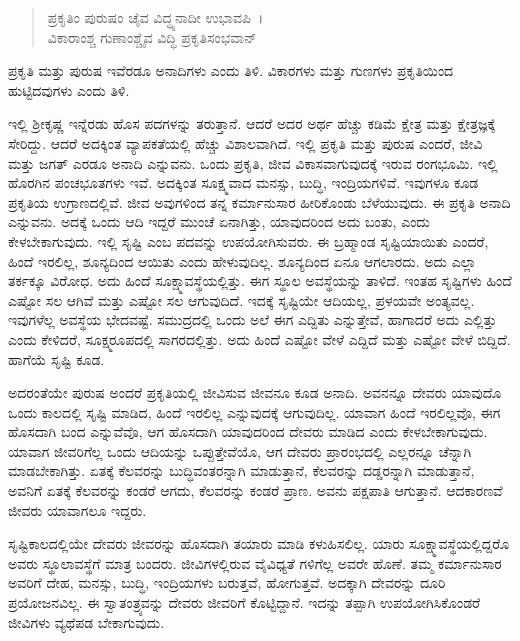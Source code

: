 \begin{verse}
ಪ್ರಕೃತಿಂ ಪುರುಷಂ ಚೈವ ವಿದ್ಧ್ಯನಾದೀ ಉಭಾವಪಿ~।\\ವಿಕಾರಾಂಶ್ಚ ಗುಣಾಂಶ್ಚೈವ ವಿದ್ಧಿ ಪ್ರಕೃತಿಸಂಭವಾನ್ 
\end{verse}

{\small ಪ್ರಕೃತಿ ಮತ್ತು ಪುರುಷ ಇವೆರಡೂ ಅನಾದಿಗಳು ಎಂದು ತಿಳಿ. ವಿಕಾರಗಳು ಮತ್ತು ಗುಣಗಳು ಪ್ರಕೃತಿಯಿಂದ ಹುಟ್ಟಿದವುಗಳು ಎಂದು ತಿಳಿ.}

ಇಲ್ಲಿ ಶ‍್ರೀಕೃಷ್ಣ ಇನ್ನೆರಡು ಹೊಸ ಪದಗಳನ್ನು ತರುತ್ತಾನೆ. ಆದರೆ ಅದರ ಅರ್ಥ ಹೆಚ್ಚು ಕಡಿಮೆ ಕ್ಷೇತ್ರ ಮತ್ತು ಕ್ಷೇತ್ರಜ್ಞಕ್ಕೆ ಸೇರಿದ್ದು. ಆದರೆ ಅದಕ್ಕಿಂತ ವ್ಯಾಪಕತೆಯಲ್ಲಿ ಹೆಚ್ಚು ವಿಶಾಲವಾಗಿದೆ. ಇಲ್ಲಿ ಪ್ರಕೃತಿ ಮತ್ತು ಪುರುಷ ಎಂದರೆ, ಜೀವಿ ಮತ್ತು ಜಗತ್ ಎರಡೂ ಅನಾದಿ ಎನ್ನುವನು. ಒಂದು ಪ್ರಕೃತಿ, ಜೀವ ವಿಕಾಸವಾಗುವುದಕ್ಕೆ ಇರುವ ರಂಗಭೂಮಿ. ಇಲ್ಲಿ ಹೊರಗಿನ ಪಂಚಭೂತಗಳು ಇವೆ. ಅದಕ್ಕಿಂತ ಸೂಕ್ಷ್ಮವಾದ ಮನಸ್ಸು, ಬುದ್ಧಿ, ಇಂದ್ರಿಯಗಳಿವೆ. ಇವುಗಳೂ ಕೂಡ ಪ್ರಕೃತಿಯ ಉಗ್ರಾಣದಲ್ಲಿವೆ. ಜೀವ ಅವುಗಳಿಂದ ತನ್ನ ಕರ್ಮಾನುಸಾರ ಹೀರಿಕೊಂಡು ಬೆಳೆಯುವುದು. ಈ ಪ್ರಕೃತಿ ಅನಾದಿ ಎನ್ನುವನು. ಅದಕ್ಕೆ ಒಂದು ಆದಿ ಇದ್ದರೆ ಮುಂಚೆ ಏನಾಗಿತ್ತು, ಯಾವುದರಿಂದ ಅದು ಬಂತು, ಎಂದು ಕೇಳಬೇಕಾಗುವುದು. ಇಲ್ಲಿ ಸೃಷ್ಟಿ ಎಂಬ ಪದವನ್ನು ಉಪಯೋಗಿಸುವರು. ಈ ಬ್ರಹ್ಮಾಂಡ ಸೃಷ್ಟಿಯಾಯಿತು ಎಂದರೆ, ಹಿಂದೆ ಇರಲಿಲ್ಲ, ಶೂನ್ಯದಿಂದ ಆಯಿತು ಎಂದು ಹೇಳುವುದಿಲ್ಲ. ಶೂನ್ಯದಿಂದ ಏನೂ ಆಗಲಾರದು. ಅದು ಎಲ್ಲಾ ತರ್ಕಕ್ಕೂ ವಿರೋಧ. ಅದು ಹಿಂದೆ ಸೂಕ್ಷ್ಮಾವಸ್ಥೆಯಲ್ಲಿತ್ತು. ಈಗ ಸ್ಥೂಲ ಅವಸ್ಥೆಯನ್ನು ತಾಳಿದೆ. ಇಂತಹ ಸೃಷ್ಟಿಗಳು ಹಿಂದೆ ಎಷ್ಟೋ ಸಲ ಆಗಿವೆ ಮತ್ತು ಎಷ್ಟೋ ಸಲ ಆಗುವುದಿದೆ. ಇದಕ್ಕೆ ಸೃಷ್ಟಿಯೇ ಆದಿಯಲ್ಲ, ಪ್ರಳಯವೇ ಅಂತ್ಯವಲ್ಲ. ಇವುಗಳೆಲ್ಲ ಅವಸ್ಥೆಯ ಭೇದವಷ್ಟೆ. ಸಮುದ್ರದಲ್ಲಿ ಒಂದು ಅಲೆ ಈಗ ಎದ್ದಿತು ಎನ್ನುತ್ತೇವೆ, ಹಾಗಾದರೆ ಅದು ಎಲ್ಲಿತ್ತು ಎಂದು ಕೇಳಿದರೆ, ಸೂಕ್ಷ್ಮರೂಪದಲ್ಲಿ ಸಾಗರದಲ್ಲಿತ್ತು. ಅದು ಹಿಂದೆ ಎಷ್ಟೋ ವೇಳೆ ಎದ್ದಿದೆ ಮತ್ತು ಎಷ್ಟೋ ವೇಳೆ ಬಿದ್ದಿದೆ. ಹಾಗೆಯೆ ಸೃಷ್ಟಿ ಕೂಡ.

ಅದರಂತೆಯೇ ಪುರುಷ ಅಂದರೆ ಪ್ರಕೃತಿಯಲ್ಲಿ ಜೀವಿಸುವ ಜೀವನೂ ಕೂಡ ಅನಾದಿ. ಅವನನ್ನೂ ದೇವರು ಯಾವುದೊ ಒಂದು ಕಾಲದಲ್ಲಿ ಸೃಷ್ಟಿ ಮಾಡಿದ, ಹಿಂದೆ ಇರಲಿಲ್ಲ ಎನ್ನುವುದಕ್ಕೆ ಆಗುವುದಿಲ್ಲ. ಯಾವಾಗ ಹಿಂದೆ ಇರಲಿಲ್ಲವೊ, ಈಗ ಹೊಸದಾಗಿ ಬಂದ ಎನ್ನುವೆವೊ, ಆಗ ಹೊಸದಾಗಿ ಯಾವುದರಿಂದ ದೇವರು ಮಾಡಿದ ಎಂದು ಕೇಳಬೇಕಾಗುವುದು. ಯಾವಾಗ ಜೀವರಿಗೆಲ್ಲ ಒಂದು ಆದಿಯನ್ನು ಒಪ್ಪುತ್ತೇವೆಯೊ, ಆಗ ದೇವರು ಪ್ರಾರಂಭದಲ್ಲಿ ಎಲ್ಲರನ್ನೂ ಚೆನ್ನಾಗಿ ಮಾಡಬೇಕಾಗಿತ್ತು. ಏತಕ್ಕೆ ಕೆಲವರನ್ನು ಬುದ್ಧಿವಂತರನ್ನಾಗಿ ಮಾಡುತ್ತಾನೆ, ಕೆಲವರನ್ನು ದಡ್ಡರನ್ನಾಗಿ ಮಾಡುತ್ತಾನೆ, ಅವನಿಗೆ ಏತಕ್ಕೆ ಕೆಲವರನ್ನು ಕಂಡರೆ ಆಗದು, ಕೆಲವರನ್ನು ಕಂಡರೆ ಪ್ರಾಣ. ಅವನು ಪಕ್ಷಪಾತಿ ಆಗುತ್ತಾನೆ. ಆದಕಾರಣವೆ ಜೀವರು ಯಾವಾಗಲೂ ಇದ್ದರು.

ಸೃಷ್ಟಿಕಾಲದಲ್ಲಿಯೇ ದೇವರು ಜೀವರನ್ನು ಹೊಸದಾಗಿ ತಯಾರು ಮಾಡಿ ಕಳುಹಿಸಲಿಲ್ಲ. ಯಾರು ಸೂಕ್ಷ್ಮಾವಸ್ಥೆಯಲ್ಲಿದ್ದರೊ ಅವರು ಸ್ಥೂಲಾವಸ್ಥೆಗೆ ಮಾತ್ರ ಬಂದರು. ಜೀವಿಗಳಲ್ಲಿರುವ ವೈವಿಧ್ಯತೆ ಗಳಿಗೆಲ್ಲ ಅವರೇ ಹೊಣೆ. ತಮ್ಮ ಕರ್ಮಾನುಸಾರ ಅವರಿಗೆ ದೇಹ, ಮನಸ್ಸು, ಬುದ್ಧಿ, ಇಂದ್ರಿಯಗಳು ಬರುತ್ತವೆ, ಹೋಗುತ್ತವೆ. ಅದಕ್ಕಾಗಿ ದೇವರನ್ನು ದೂರಿ ಪ್ರಯೋಜನವಿಲ್ಲ. ಈ ಸ್ವಾತಂತ್ರ್ಯವನ್ನು ದೇವರು ಜೀವರಿಗೆ ಕೊಟ್ಟಿದ್ದಾನೆ. ಇದನ್ನು ತಪ್ಪಾಗಿ ಉಪಯೋಗಿಸಿಕೊಂಡರೆ ಜೀವಿಗಳು ವ್ಯಥೆಪಡ ಬೇಕಾಗುವುದು.


